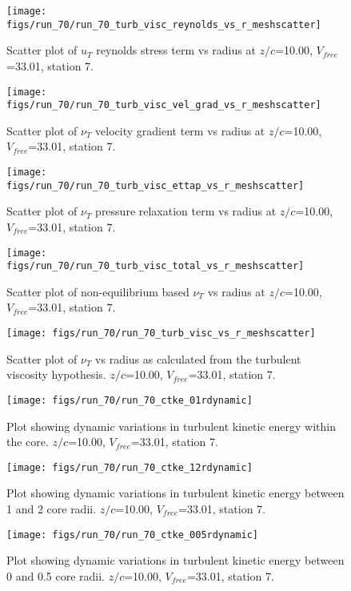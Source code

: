 \begin{figure}[H]
\centering
\texttt{[image: figs/run\_70/run\_70\_turb\_visc\_reynolds\_vs\_r\_meshscatter]}
\caption{Scatter plot of $
u_T$ reynolds stress term vs radius at $z/c$=10.00, $V_{free}$=33.01, station 7.}
\end{figure}


\begin{figure}[H]
\centering
\texttt{[image: figs/run\_70/run\_70\_turb\_visc\_vel\_grad\_vs\_r\_meshscatter]}
\caption{Scatter plot of $\nu_T$ velocity gradient term vs radius at $z/c$=10.00, $V_{free}$=33.01, station 7.}
\end{figure}


\begin{figure}[H]
\centering
\texttt{[image: figs/run\_70/run\_70\_turb\_visc\_ettap\_vs\_r\_meshscatter]}
\caption{Scatter plot of $\nu_T$ pressure relaxation term vs radius at $z/c$=10.00, $V_{free}$=33.01, station 7.}
\end{figure}


\begin{figure}[H]
\centering
\texttt{[image: figs/run\_70/run\_70\_turb\_visc\_total\_vs\_r\_meshscatter]}
\caption{Scatter plot of non-equilibrium based $\nu_T$ vs radius at $z/c$=10.00, $V_{free}$=33.01, station 7.}
\end{figure}


\begin{figure}[H]
\centering
\texttt{[image: figs/run\_70/run\_70\_turb\_visc\_vs\_r\_meshscatter]}
\caption{Scatter plot of $\nu_T$ vs radius as calculated from the turbulent viscosity hypothesis. $z/c$=10.00, $V_{free}$=33.01, station 7.}
\end{figure}


\begin{figure}[H]
\centering
\texttt{[image: figs/run\_70/run\_70\_ctke\_01rdynamic]}
\caption{Plot showing dynamic variations in turbulent kinetic energy within the core. $z/c$=10.00, $V_{free}$=33.01, station 7.}
\end{figure}


\begin{figure}[H]
\centering
\texttt{[image: figs/run\_70/run\_70\_ctke\_12rdynamic]}
\caption{Plot showing dynamic variations in turbulent kinetic energy between 1 and 2 core radii. $z/c$=10.00, $V_{free}$=33.01, station 7.}
\end{figure}


\begin{figure}[H]
\centering
\texttt{[image: figs/run\_70/run\_70\_ctke\_005rdynamic]}
\caption{Plot showing dynamic variations in turbulent kinetic energy between 0 and 0.5 core radii. $z/c$=10.00, $V_{free}$=33.01, station 7.}
\end{figure}


